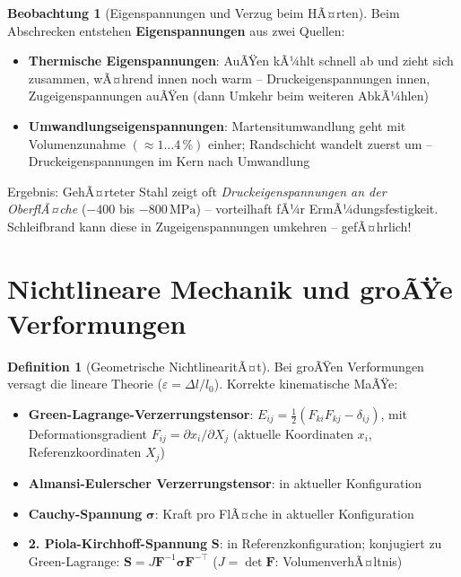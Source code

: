﻿\documentclass[a4paper,12pt]{report}
\theoremstyle{definition}
\newtheorem{definition}{Definition}
\newtheorem{beobachtung}{Beobachtung}
\begin{document}
\begin{beobachtung}[Eigenspannungen und Verzug beim HÃ¤rten]
Beim Abschrecken entstehen \textbf{Eigenspannungen} aus zwei Quellen:
\begin{itemize}
    \item[-] \textbf{Thermische Eigenspannungen}: AuÃŸen kÃ¼hlt schnell ab
          und zieht sich zusammen, wÃ¤hrend innen noch warm -- Druckeigenspannungen innen,
          Zugeigenspannungen auÃŸen (dann Umkehr beim weiteren AbkÃ¼hlen)
    \item[-] \textbf{Umwandlungseigenspannungen}: Martensitumwandlung
          geht mit Volumenzunahme $(\approx 1\ldots4\,\%)$ einher;
          Randschicht wandelt zuerst um -- Druckeigenspannungen im Kern nach Umwandlung
\end{itemize}
Ergebnis: GehÃ¤rteter Stahl zeigt oft \emph{Druckeigenspannungen an der OberflÃ¤che}
($-400$ bis $-800\,\mathrm{MPa}$) -- vorteilhaft fÃ¼r ErmÃ¼dungsfestigkeit.
Schleifbrand kann diese in Zugeigenspannungen umkehren -- gefÃ¤hrlich!
\end{beobachtung}

\section{Nichtlineare Mechanik und groÃŸe Verformungen}

\begin{definition}[Geometrische NichtlinearitÃ¤t]
Bei groÃŸen Verformungen versagt die lineare Theorie ($\varepsilon = \Delta l/l_0$).
Korrekte kinematische MaÃŸe:
\begin{itemize}
    \item[-] \textbf{Green-Lagrange-Verzerrungstensor}: $E_{ij} = \tfrac{1}{2}(F_{ki}F_{kj} - \delta_{ij})$,
          mit Deformationsgradient $F_{ij} = \partial x_i/\partial X_j$
          (aktuelle Koordinaten $x_i$, Referenzkoordinaten $X_j$)
    \item[-] \textbf{Almansi-Eulerscher Verzerrungstensor}: in aktueller Konfiguration
    \item[-] \textbf{Cauchy-Spannung} $\boldsymbol{\sigma}$: Kraft pro FlÃ¤che in aktueller Konfiguration
    \item[-] \textbf{2. Piola-Kirchhoff-Spannung} $\mathbf{S}$: in Referenzkonfiguration;
          konjugiert zu Green-Lagrange: $\mathbf{S} = J\mathbf{F}^{-1}\boldsymbol{\sigma}\mathbf{F}^{-\top}$
          ($J = \det\mathbf{F}$: VolumenverhÃ¤ltnis)
\end{itemize}
\end{definition}
\end{document}
